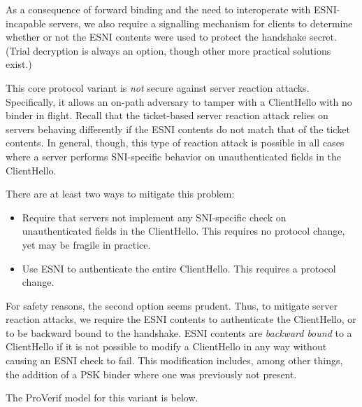 \documentclass{article}
\theoremstyle{definition}
\theoremstyle{definition}
\begin{document}
As a consequence of forward binding and the need to interoperate with ESNI-incapable servers, 
we also require a signalling mechanism for clients to determine whether or not the ESNI contents were 
used to protect the handshake secret. (Trial decryption is always an option, though other more practical 
solutions exist.)

This core protocol variant is \emph{not} secure against server reaction attacks.
Specifically, it allows an on-path adversary to tamper with a ClientHello with no
binder in flight. Recall that the ticket-based server reaction attack relies on servers
behaving differently if the ESNI contents do not match that of the ticket contents.
In general, though, this type of reaction attack is possible in all cases where a server
performs SNI-specific behavior on unauthenticated fields in the ClientHello. 

There are at least two ways to mitigate this problem:
%
\begin{itemize}
  \item Require that servers not implement any SNI-specific check on unauthenticated fields
  in the ClientHello. This requires no protocol change, yet may be fragile in practice.
  \item Use ESNI to authenticate the entire ClientHello. This requires a protocol change.
\end{itemize}
%

For safety reasons, the second option seems prudent. Thus, to mitigate server reaction attacks,
we require the ESNI contents to authenticate the ClientHello, or to be backward bound to the 
handshake. ESNI contents are \emph{backward bound} to a ClientHello if it is not possible 
to modify a ClientHello in any way without causing an ESNI check to fail. This modification includes,
among other things, the addition of a PSK binder where one was previously not present.

The ProVerif model for this variant is below.
\end{document}
